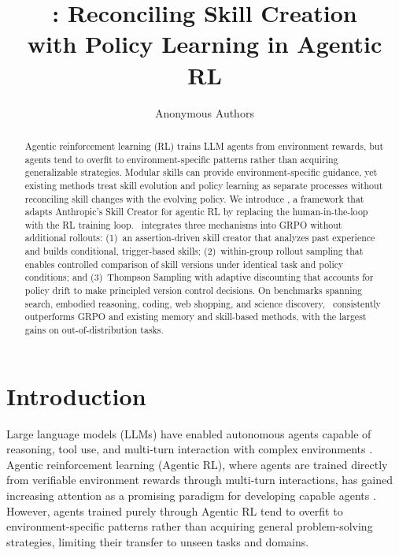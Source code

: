 \documentclass{article}
\title{\ours: Reconciling Skill Creation \\ with Policy Learning in Agentic RL}
\author{%
  Anonymous Authors
}
\theoremstyle{plain}
\theoremstyle{definition}
\theoremstyle{remark}
\begin{document}
\maketitle

\begin{abstract}
Agentic reinforcement learning (RL) trains LLM agents from environment rewards, but agents tend to overfit to environment-specific patterns rather than acquiring generalizable strategies. Modular skills can provide environment-specific guidance, yet existing methods treat skill evolution and policy learning as separate processes without reconciling skill changes with the evolving policy. We introduce \ours, a framework that adapts Anthropic's Skill Creator for agentic RL by replacing the human-in-the-loop with the RL training loop. \ours~integrates three mechanisms into GRPO without additional rollouts: (1)~an assertion-driven skill creator that analyzes past experience and builds conditional, trigger-based skills; (2)~within-group rollout sampling that enables controlled comparison of skill versions under identical task and policy conditions; and (3)~Thompson Sampling with adaptive discounting that accounts for policy drift to make principled version control decisions. On benchmarks spanning search, embodied reasoning, coding, web shopping, and science discovery, \ours~consistently outperforms GRPO and existing memory and skill-based methods, with the largest gains on out-of-distribution tasks.
\end{abstract}

\section{Introduction}

Large language models (LLMs) have enabled autonomous agents capable of reasoning, tool use, and multi-turn interaction with complex environments \citep{yao2023react, jimenez2023swe, su2025learnbyinteract}. Agentic reinforcement learning (Agentic RL), where agents are trained directly from verifiable environment rewards through multi-turn interactions, has gained increasing attention as a promising paradigm for developing capable agents \citep{shao2024deepseekmath, guo2025deepseek, jin2025search, xue2025simpletir}. However, agents trained purely through Agentic RL tend to overfit to environment-specific patterns rather than acquiring general problem-solving strategies, limiting their transfer to unseen tasks and domains.
\end{document}
